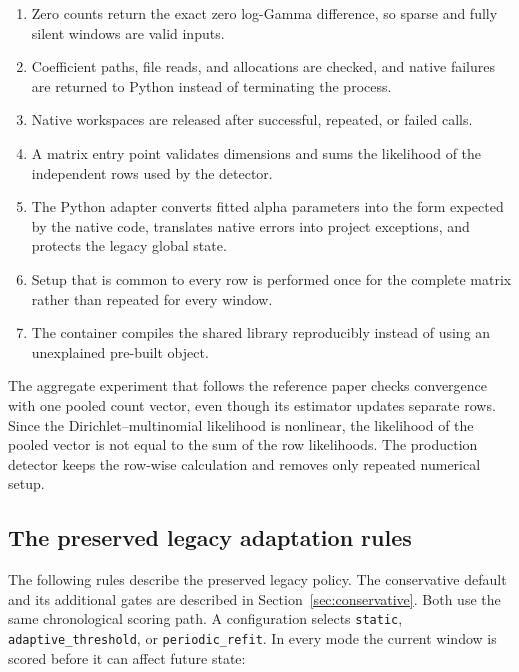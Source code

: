 \begin{enumerate}
  \item Zero counts return the exact zero log-Gamma difference, so sparse and
  fully silent windows are valid inputs.
  \item Coefficient paths, file reads, and allocations are checked, and native
  failures are returned to Python instead of terminating the process.
  \item Native workspaces are released after successful, repeated, or failed
  calls.
  \item A matrix entry point validates dimensions and sums the likelihood of the
  independent rows used by the detector.
  \item The Python adapter converts fitted alpha parameters into the form
  expected by the native code, translates native errors into project exceptions,
  and protects the legacy global state.
  \item Setup that is common to every row is performed once for the complete
  matrix rather than repeated for every window.
  \item The container compiles the shared library reproducibly instead of using
  an unexplained pre-built object.
\end{enumerate}

The aggregate experiment that follows the reference paper checks convergence
with one pooled count vector, even though its estimator updates separate rows.
Since the Dirichlet--multinomial likelihood is nonlinear, the likelihood of the
pooled vector is not equal to the sum of the row likelihoods. The production
detector keeps the row-wise calculation and removes only repeated numerical
setup.

\subsection{The preserved legacy adaptation rules}

The following rules describe the preserved legacy policy. The conservative
default and its additional gates are described in Section~\ref{sec:conservative}.
Both use the same chronological scoring path. A configuration
selects \texttt{static}, \texttt{adaptive\_threshold}, or
\texttt{periodic\_refit}. In every mode the current window is scored before it can
affect future state:

\begin{center}
\end{center}

